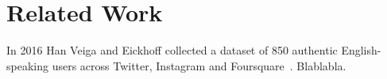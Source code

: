 \chapter{Related Work}\label{ch:rel}

In 2016 Han Veiga and Eickhoff collected a dataset of 850 authentic English-speaking users across Twitter, Instagram and Foursquare~\cite{OSN}. Blablabla.
